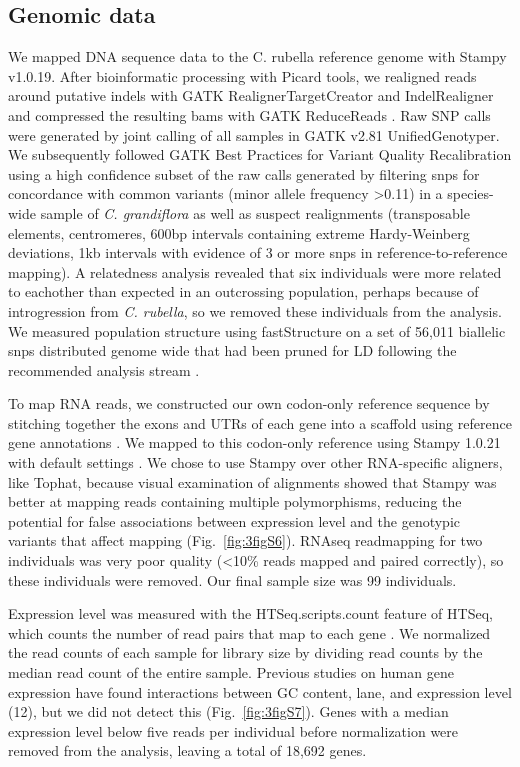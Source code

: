 \subsection{Genomic data}
We mapped DNA sequence data to the C. rubella reference genome\citep{Slotte2013-py} with Stampy v1.0.19. After bioinformatic processing with Picard tools, we realigned reads around putative indels with GATK RealignerTargetCreator and IndelRealigner and compressed the resulting bams with GATK ReduceReads \citep{DePristo2011-jc}. Raw SNP calls were generated by joint calling of all samples in GATK v2.81 UnifiedGenotyper. We subsequently followed GATK Best Practices for Variant Quality Recalibration using a high confidence subset of the  raw calls generated by filtering snps for concordance with common variants (minor allele frequency \textgreater 0.11) in a species-wide sample of \textit{C. grandiflora} \citep{Williamson2014-tf} as well as suspect realignments (transposable elements, centromeres, 600bp intervals containing extreme Hardy-Weinberg deviations, 1kb intervals with evidence of 3 or more snps in reference-to-reference mapping). A relatedness analysis revealed that six individuals were more related to eachother than expected in an outcrossing population, perhaps because of introgression from \textit{C. rubella}, so we removed these individuals from the analysis. We measured population structure using fastStructure on a set of 56,011 biallelic snps distributed genome wide that had been pruned for LD following the recommended analysis stream \citep{Raj2014-im}.

To map RNA reads, we constructed our own codon-only reference sequence by stitching together the exons and UTRs of each gene into a scaffold using reference gene annotations \citep{Slotte2013-py}. We mapped to this codon-only reference using Stampy 1.0.21 with default settings \citep{Lunter2011-uc}. We chose to use Stampy over other RNA-specific aligners, like Tophat, because visual examination of alignments showed that Stampy was better at mapping reads containing multiple polymorphisms, reducing the potential for false associations between expression level and the genotypic variants that affect mapping (Fig.~\ref{fig:3figS6}). RNAseq readmapping for two individuals was very poor quality (\textless10\% reads mapped and paired correctly), so these individuals were removed. Our final sample size was 99 individuals.

Expression level was measured with the HTSeq.scripts.count feature of HTSeq, which counts the number of read pairs that map to each gene \citep{Anders2015-qa}. We normalized the read counts of each sample for library size by dividing read counts by the median read count of the entire sample. Previous studies on human gene expression have found interactions between GC content, lane, and expression level (12), but we did not detect this (Fig.~\ref{fig:3figS7}). Genes with a median expression level below five reads per individual before normalization were removed from the analysis, leaving a total of 18,692 genes.

